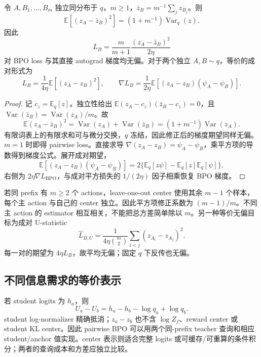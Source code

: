 \documentclass[lang=cn,scheme=chinese,openany]{../book/elegantbook}
\newcommand{\E}{\mathbb E}
\newcommand{\Var}{\operatorname{Var}}
\begin{document}
\begin{theorem}
\label{est:bpo-sampling}
令 $A,B_1,\ldots,B_m$ 独立同分布于 $q$，$m\geq1$，$\bar z_B=m^{-1}\sum_jz_{B_j}$。则
\begin{equation}
\E[(z_A-\bar z_B)^2]=(1+m^{-1})\Var_q(z).
\end{equation}
因此
\begin{equation}
\widehat L_B=\frac{m}{m+1}\frac{(z_A-\bar z_B)^2}{2\eta}
\end{equation}
对 BPO loss 与其直接 autograd 梯度均无偏。对于两个独立 $A,B\sim q$，等价的成对形式为
\begin{equation}
L_B=\frac1{4\eta}\E[(z_A-z_B)^2],\qquad
\nabla L_B=\frac1{2\eta}\E[(z_A-z_B)(\psi_A-\psi_B)].
\end{equation}
\end{theorem}
\begin{proof}
记 $c_z=\E_q[z]$。独立性给出 $\E(z_A-c_z)(\bar z_B-c_z)=0$，且 $\Var(\bar z_B)=\Var(z_A)/m$。故
\begin{equation}
\E(z_A-\bar z_B)^2=\Var(z_A)+\Var(\bar z_B)=(1+m^{-1})\Var(z_A).
\end{equation}
有限词表上的有限求和可与微分交换，$q$ 冻结，因此修正后的梯度期望同样无偏。$m=1$ 时即得 pairwise loss。直接求导 $\nabla(z_A-z_B)=\psi_A-\psi_B$，乘平方项的导数得到梯度公式。展开成对期望，
\begin{equation}
\E[(z_A-z_B)(\psi_A-\psi_B)]
=2\{\E_q[z\psi]-\E_q[z]\E_q[\psi]\},
\end{equation}
右侧为 $2\eta\nabla L_{\mathrm{BPO}}$，与成对平方损失的 $1/(2\eta)$ 因子相乘恢复 BPO 梯度。
\end{proof}

若同 prefix 有 $m\geq2$ 个 actions，leave-one-out center 使用其余 $m-1$ 个样本，每个主 action 与自己的 center 独立。因此平方项修正系数为 $(m-1)/m$。不同主 action 的 estimator 相互相关，不能把总方差简单除以 $m$。另一种等价无偏目标为成对 U-statistic
\begin{equation}
\widehat L_{B,U}=\frac1{4\eta\binom m2}\sum_{i<j}(z_{A_i}-z_{A_j})^2.
\end{equation}
每一对的期望为 $4\eta L_B$，故平均无偏；固定 $q$ 下反传也无偏。

\subsection{不同信息需求的等价表示}
\label{est:bpo-access}
若 student logits 为 $h_a$，则
\begin{equation}
U_a-U_b=h_a-h_b-\log q_a+\log q_b.
\end{equation}
student log-normalizer 精确抵消；$z_a-z_b$ 也不含 $\log Z_f$、reward center 或 student KL center。因此 pairwise BPO 可以用两个同-prefix teacher 查询和相应 student/anchor 值实现。center 表示则适合完整 logits 或可缓存/可重算的条件积分；两者的查询成本和方差应独立比较。
\end{document}
